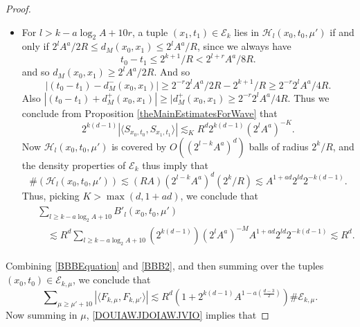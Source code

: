 \begin{proof}
\begin{itemize}
    \item For $l > k - a \log_2 A + 10 r$, a tuple $(x_1,t_1) \in \mathcal{E}_k$ lies in $\mathcal{H}_l(x_0,t_0,\mu')$ if and only if $2^l A^a / 2 R \leq d_M(x_0,x_1) \leq 2^l A^a / R$, since we always have
    \begin{equation}
         t_0 - t_1 \leq 2^{k+1}/R < 2^{l+r} A^a / 8R.
    \end{equation}
    and so $d_M(x_0,x_1) \geq 2^l A^a / 2R$. And so 
    \[ |(t_0 - t_1) - d_M^-(x_0,x_1)| \geq 2^{-r} 2^l A^a / 2R - 2^{k+1} / R \geq 2^{-r} 2^l A^a / 4R. \]
    Also $|(t_0 - t_1) + d_M^+(x_0,x_1)| \geq |d_M^+(x_0,x_1) \geq 2^{-r} 2^l A^a / 4R$. Thus we conclude from Proposition \ref{theMainEstimatesForWave} that
    \begin{equation}
        2^{k(d-1)} |\langle {S\!}_{x_0,t_0}, {S\!}_{x_1,t_1} \rangle| \lesssim_K R^{d} 2^{k(d-1)} (2^l A^a)^{- K}.
    \end{equation}
    Now $\mathcal{H}_l(x_0,t_0,\mu')$ is covered by $O( (2^{l-k} A^a)^d )$ balls of radius $2^k / R$, and the density properties of $\mathcal{E}_k$ thus imply that
    \begin{equation}
        \#(\mathcal{H}_l(x_0,t_0,\mu')) \lesssim (RA) (2^{l-k} A^a)^d ( 2^k / R ) \lesssim A^{1 + ad} 2^{ld} 2^{-k(d-1)}.
    \end{equation}
    Thus, picking $K > \max(d,1+ad)$, we conclude that
    \begin{align} \label{BBB2}
    \begin{split}
        &\sum\nolimits_{l \geq k - a \log_2 A + 10} B'_l(x_0,t_0,\mu')\\
        &\quad \lesssim R^{d} \sum\nolimits_{l \geq k - a \log_2 A + 10} (2^{k(d-1)}) (2^l A^a)^{-M} A^{1 + ad} 2^{ld} 2^{-k(d-1)} \lesssim R^{d}.
    \end{split}
    \end{align}
    \end{itemize}
    Combining \eqref{BBBEquation} and \eqref{BBB2}, and then summing over the tuples $(x_0,t_0) \in \mathcal{E}_{k,\mu}$, we conclude that
    \begin{equation} \label{DOUIAWJDOIAWJVIO}
        \sum\nolimits_{\mu \geq \mu' + 10} |\langle F_{k,\mu}, F_{k,\mu'} \rangle| \lesssim R^{d} \left( 1 + 2^{k(d-1)} A^{1 - a \left( \frac{d-3}{2} \right)} \right) \# \mathcal{E}_{k,\mu}.
    \end{equation}
    Now summing in $\mu$, \eqref{DOUIAWJDOIAWJVIO} implies that

\end{proof}

